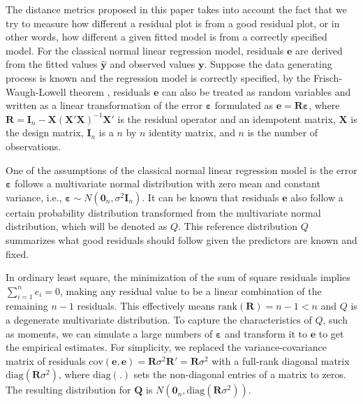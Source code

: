 \documentclass[]{interact}
\theoremstyle{plain}%
\theoremstyle{definition}
\theoremstyle{remark}
\begin{document}
The distance metrics proposed in this paper takes into account the fact
that we try to measure how different a residual plot is from a good
residual plot, or in other words, how different a given fitted model is
from a correctly specified model. For the classical normal linear
regression model, residuals \(\boldsymbol{e}\) are derived from the
fitted values \(\hat{\boldsymbol{y}}\) and observed values
\(\boldsymbol{y}\). Suppose the data generating process is known and the
regression model is correctly specified, by the Frisch-Waugh-Lowell
theorem \citep{frisch1933partial}, residuals \(\boldsymbol{e}\) can also
be treated as random variables and written as a linear transformation of
the error \(\boldsymbol{\varepsilon}\) formulated as
\(\boldsymbol{e} = \boldsymbol{R}\boldsymbol{\varepsilon}\), where
\(\boldsymbol{R}=\boldsymbol{I}_n -\boldsymbol{X}(\boldsymbol{X}'\boldsymbol{X})^{-1}\boldsymbol{X}'\)
is the residual operator and an idempotent matrix, \(\boldsymbol{X}\) is
the design matrix, \(\boldsymbol{I}_n\) is a \(n\) by \(n\) identity
matrix, and \(n\) is the number of observations.

One of the assumptions of the classical normal linear regression model
is the error \(\boldsymbol{\varepsilon}\) follows a multivariate normal
distribution with zero mean and constant variance, i.e.,
\(\boldsymbol{\varepsilon} \sim N(\boldsymbol{0}_n,\sigma^2\boldsymbol{I}_n)\).
It can be known that residuals \(\boldsymbol{e}\) also follow a certain
probability distribution transformed from the multivariate normal
distribution, which will be denoted as \(Q\). This reference
distribution \(Q\) summarizes what good residuals should follow given
the predictors are known and fixed.

In ordinary least square, the minimization of the sum of square
residuals implies \(\sum_{i=1}^{n} e_i = 0\), making any residual value
to be a linear combination of the remaining \(n - 1\) residuals. This
effectively means \(\text{rank}(\boldsymbol{R}) = n - 1 < n\) and \(Q\)
is a degenerate multivariate distribution. To capture the
characteristics of \(Q\), such as moments, we can simulate a large
numbers of \(\boldsymbol{\varepsilon}\) and transform it to
\(\boldsymbol{e}\) to get the empirical estimates. For simplicity, we
replaced the variance-covariance matrix of residuals
\(\text{cov}(\boldsymbol{e}, \boldsymbol{e}) = \boldsymbol{R}\sigma^2\boldsymbol{R}' = \boldsymbol{R}\sigma^2\)
with a full-rank diagonal matrix
\(\text{diag}(\boldsymbol{R}\sigma^2)\), where \(\text{diag}(.)\) sets
the non-diagonal entries of a matrix to zeros. The resulting
distribution for \(\boldsymbol{Q}\) is
\(N(\boldsymbol{0}_n, \text{diag}(\boldsymbol{R}\sigma^2))\).
\end{document}
